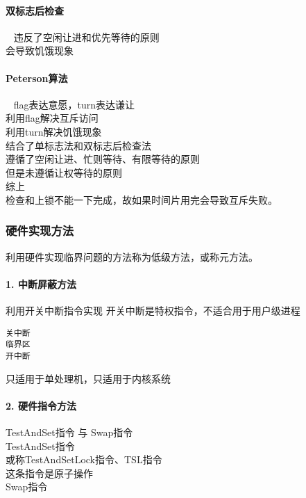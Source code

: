\paragraph{双标志后检查}~{}
\newline
违反了空闲让进和优先等待的原则 \\
会导致饥饿现象 \\

\paragraph{Peterson算法}~{}
\newline
flag表达意愿，turn表达谦让 \\
利用flag解决互斥访问 \\
利用turn解决饥饿现象 \\
结合了单标志法和双标志后检查法 \\
遵循了空闲让进、忙则等待、有限等待的原则 \\ 
但是未遵循让权等待的原则 \\

\noindent
综上 \\ 
检查和上锁不能一下完成，故如果时间片用完会导致互斥失败。 \\ 

\subsubsection{硬件实现方法}
利用硬件实现临界问题的方法称为低级方法，或称元方法。 \\

\paragraph{1. 中断屏蔽方法}
利用开关中断指令实现
开关中断是特权指令，不适合用于用户级进程
\begin{lstlisting}
关中断
临界区
开中断
\end{lstlisting}
只适用于单处理机，只适用于内核系统

\paragraph{2. 硬件指令方法} TestAndSet指令 与 Swap指令 \\
TestAndSet指令 \\
或称TestAndSetLock指令、TSL指令 \\
这条指令是原子操作 \\

\noindent
Swap指令 \\

